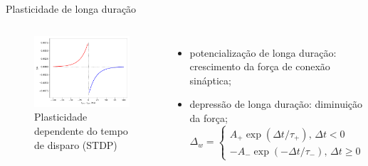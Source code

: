 \begin{frame}{Plasticidade de longa duração}
	\begin{columns}[t]
		\column{5cm}
			\begin{figure}[tb]
				\centering
				\caption{Plasticidade dependente do tempo de disparo (STDP)}
				\label{fig:stdp}
				\includegraphics[width=\linewidth]{figs/stdp}
			\end{figure}
		\column{5cm}
			\begin{itemize}
				\item potencialização de longa duração: crescimento da força de conexão sináptica;
				\item depressão de longa duração: diminuição da força;
				\[
					\Delta_w=\begin{cases}
						A_+\exp(\Delta t/\tau_+)\text{, }\Delta t<0\\
						-A_-\exp(-\Delta t/\tau_-)\text{, }\Delta t\geq0
					\end{cases}
				\]
			\end{itemize}
	\end{columns}
\end{frame}
